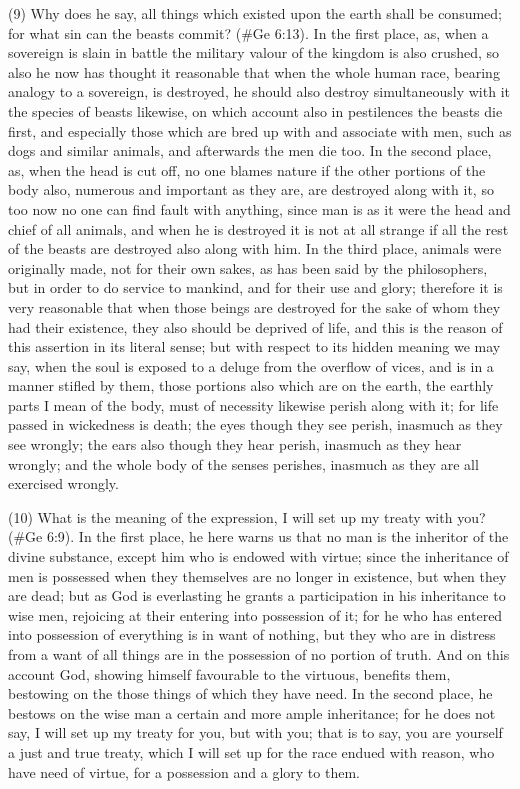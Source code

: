 (9) Why does he say, all things which existed upon the earth shall be consumed; for what sin can
the beasts commit? (\#Ge 6:13). In the first place, as, when a sovereign is slain in battle the
military valour of the kingdom is also crushed, so also he now has thought it reasonable that when
the whole human race, bearing analogy to a sovereign, is destroyed, he should also destroy
simultaneously with it the species of beasts likewise, on which account also in pestilences the
beasts die first, and especially those which are bred up with and associate with men, such as dogs
and similar animals, and afterwards the men die too. In the second place, as, when the head is cut
off, no one blames nature if the other portions of the body also, numerous and important as they
are, are destroyed along with it, so too now no one can find fault with anything, since man is as it
were the head and chief of all animals, and when he is destroyed it is not at all strange if all the rest
of the beasts are destroyed also along with him. In the third place, animals were originally made,
not for their own sakes, as has been said by the philosophers, but in order to do service to
mankind, and for their use and glory; therefore it is very reasonable that when those beings are
destroyed for the sake of whom they had their existence, they also should be deprived of life, and
this is the reason of this assertion in its literal sense; but with respect to its hidden meaning we
may say, when the soul is exposed to a deluge from the overflow of vices, and is in a manner
stifled by them, those portions also which are on the earth, the earthly parts I mean of the body,
must of necessity likewise perish along with it; for life passed in wickedness is death; the eyes
though they see perish, inasmuch as they see wrongly; the ears also though they hear perish,
inasmuch as they hear wrongly; and the whole body of the senses perishes, inasmuch as they are
all exercised wrongly.

(10) What is the meaning of the expression, I will set up my treaty with you? (\#Ge 6:9). In the
first place, he here warns us that no man is the inheritor of the divine substance, except him who is
endowed with virtue; since the inheritance of men is possessed when they themselves are no
longer in existence, but when they are dead; but as God is everlasting he grants a participation in
his inheritance to wise men, rejoicing at their entering into possession of it; for he who has entered
into possession of everything is in want of nothing, but they who are in distress from a want of all
things are in the possession of no portion of truth. And on this account God, showing himself
favourable to the virtuous, benefits them, bestowing on the those things of which they have need. In
the second place, he bestows on the wise man a certain and more ample inheritance; for he does
not say, I will set up my treaty for you, but with you; that is to say, you are yourself a just and true
treaty, which I will set up for the race endued with reason, who have need of virtue, for a
possession and a glory to them.

